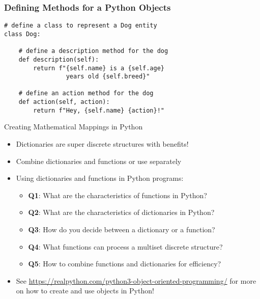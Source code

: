 \documentclass[14pt,aspectratio=169]{beamer}
\begin{document}
%
\begin{frame}[fragile]
  \frametitle{Defining Methods for a Python Objects}
  \hspace*{-.15in}
  \begin{minipage}{6in}
    \vspace*{.2in}
    \begin{verbatim}
# define a class to represent a Dog entity
class Dog:

    # define a description method for the dog
    def description(self):
        return f"{self.name} is a {self.age}
                 years old {self.breed}"

    # define an action method for the dog
    def action(self, action):
        return f"Hey, {self.name} {action}!"
    \end{verbatim}
  \end{minipage}
\end{frame}

%
\begin{frame}{Creating Mathematical Mappings in Python}
  \begin{itemize}
    \item Dictionaries are super discrete structures with benefits!
      \vspace*{-.2in}
    \item Combine dictionaries and functions or use separately
      \vspace*{-.2in}
    \item Using dictionaries and functions in Python programs:
      \begin{itemize}
        \item {\bf Q1}: What are the characteristics of functions in Python?
        \item {\bf Q2}: What are the characteristics of dictionaries in Python?
        \item {\bf Q3}: How do you decide between a dictionary or a function?
        \item {\bf Q4}: What functions can process a multiset discrete
          structure?
        \item {\bf Q5}: How to combine functions and dictionaries for
          efficiency?
      \end{itemize}
      \vspace*{-.2in}
    \item See \url{https://realpython.com/python3-object-oriented-programming/}
      for more on how to create and use objects in Python!
  \end{itemize}
\end{frame}
\end{document}
